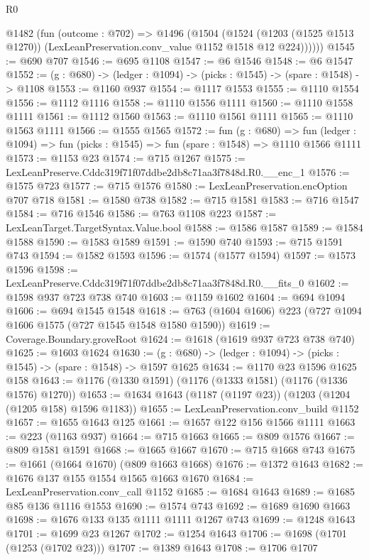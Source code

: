 \begin{lexlean}{R0}
\begin{coremodule}
      @1482
        (fun (outcome : @702) =>
        @1496
          (@1504
            (@1524
              (@1203 (@1525 @1513 @1270))
              (LexLeanPreservation.conv_value @1152 @1518 @12 @224))))))
@1545 := @690 @707
@1546 := @695 @1108
@1547 := @6 @1546
@1548 := @6 @1547
@1552 := (g : @680) -> (ledger : @1094) -> (picks : @1545) -> (spare : @1548) -> @1108
@1553 := @1160 @937
@1554 := @1117 @1553
@1555 := @1110 @1554
@1556 := @1112 @1116
@1558 := @1110 @1556 @1111
@1560 := @1110 @1558 @1111
@1561 := @1112 @1560
@1563 := @1110 @1561 @1111
@1565 := @1110 @1563 @1111
@1566 := @1555 @1565
@1572 := fun (g : @680) =>
  fun (ledger : @1094) => fun (picks : @1545) => fun (spare : @1548) => @1110 @1566 @1111
@1573 := @1153 @23
@1574 := @715 @1267
@1575 := LexLeanPreserve.Cddc319f71f07ddbe2db8c71aa3f7848d.R0.__enc_1
@1576 := @1575 @723
@1577 := @715 @1576
@1580 := LexLeanPreservation.encOption @707 @718
@1581 := @1580 @738
@1582 := @715 @1581
@1583 := @716 @1547
@1584 := @716 @1546
@1586 := @763 @1108 @223
@1587 := LexLeanTarget.TargetSyntax.Value.bool
@1588 := @1586 @1587
@1589 := @1584 @1588
@1590 := @1583 @1589
@1591 := @1590 @740
@1593 := @715 @1591 @743
@1594 := @1582 @1593
@1596 := @1574 (@1577 @1594)
@1597 := @1573 @1596
@1598 := LexLeanPreserve.Cddc319f71f07ddbe2db8c71aa3f7848d.R0.__fits_0
@1602 := @1598 @937 @723 @738 @740
@1603 := @1159 @1602
@1604 := @694 @1094
@1606 := @694 @1545 @1548
@1618 := @763 (@1604 @1606) @223 (@727 @1094 @1606 @1575 (@727 @1545 @1548 @1580 @1590))
@1619 := Coverage.Boundary.groveRoot
@1624 := @1618 (@1619 @937 @723 @738 @740)
@1625 := @1603 @1624
@1630 := (g : @680) -> (ledger : @1094) -> (picks : @1545) -> (spare : @1548) -> @1597 @1625
@1634 := @1170 @23 @1596 @1625 @158
@1643 := @1176 (@1330 @1591) (@1176 (@1333 @1581) (@1176 (@1336 @1576) @1270))
@1653 := @1634 @1643 (@1187 (@1197 @23)) (@1203 (@1204 (@1205 @158) @1596 @1183))
@1655 := LexLeanPreservation.conv_build @1152
@1657 := @1655 @1643 @125
@1661 := @1657 @122 @156 @1566 @1111
@1663 := @223 (@1163 @937)
@1664 := @715 @1663
@1665 := @809 @1576
@1667 := @809 @1581 @1591
@1668 := @1665 @1667
@1670 := @715 @1668 @743
@1675 := @1661 (@1664 @1670) (@809 @1663 @1668)
@1676 := @1372 @1643
@1682 := @1676 @137 @155 @1554 @1565 @1663 @1670
@1684 := LexLeanPreservation.conv_call @1152
@1685 := @1684 @1643
@1689 := @1685 @85 @136 @1116 @1553
@1690 := @1574 @743
@1692 := @1689 @1690 @1663
@1698 := @1676 @133 @135 @1111 @1111 @1267 @743
@1699 := @1248 @1643
@1701 := @1699 @23 @1267
@1702 := @1254 @1643
@1706 := @1698 (@1701 (@1253 (@1702 @23)))
@1707 := @1389 @1643
@1708 := @1706 @1707

\end{coremodule}
\end{lexlean}

